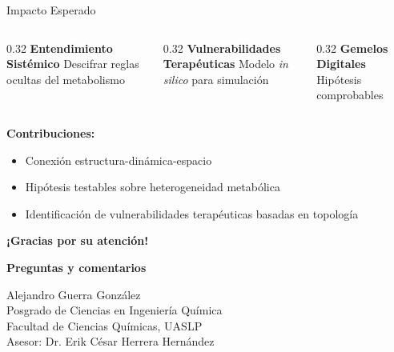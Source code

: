\documentclass[aspectratio=169, 11pt]{beamer}
\begin{document}
	\begin{frame}{Impacto Esperado}
		\begin{columns}
			\begin{column}{0.32\textwidth}
				\centering
				\textbf{Entendimiento Sistémico}
				\vspace{0.2cm}
				\framebox[0.8\textwidth]{\centering [img]}
				\footnotesize Descifrar reglas ocultas del metabolismo
			\end{column}
			\begin{column}{0.32\textwidth}
				\centering
				\textbf{Vulnerabilidades Terapéuticas}
				\vspace{0.2cm}
				\framebox[0.8\textwidth]{\centering [img]}
				\footnotesize Modelo \textit{in silico} para simulación
			\end{column}
			\begin{column}{0.32\textwidth}
				\centering
				\textbf{Gemelos Digitales}
				\vspace{0.2cm}
				\framebox[0.8\textwidth]{\centering [img]}
				\footnotesize Hipótesis comprobables
			\end{column}
		\end{columns}
		
		\vspace{0.3cm}
		\textbf{Contribuciones:}
		\begin{itemize}
			\item Conexión estructura-dinámica-espacio
			\item Hipótesis testables sobre heterogeneidad metabólica
			\item Identificación de vulnerabilidades terapéuticas basadas en topología
		\end{itemize}
	\end{frame}
	
	\begin{frame}
		\centering
		\Huge \textbf{¡Gracias por su atención!}
		\vspace{1cm}
		
		\Large \textbf{Preguntas y comentarios}
		
		\vspace{1cm}
		\normalsize
		Alejandro Guerra González\\
		Posgrado de Ciencias en Ingeniería Química\\
		Facultad de Ciencias Químicas, UASLP\\
		\vspace{0.3cm}
		Asesor: Dr. Erik César Herrera Hernández
	\end{frame}
	
\end{document}

